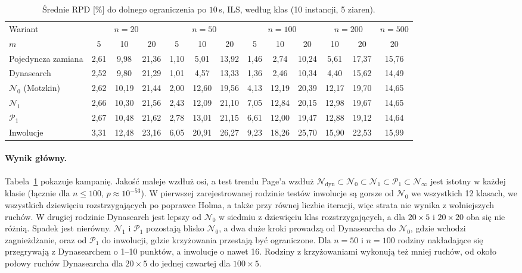 \documentclass[10pt,twocolumn]{article}
\newcommand{\N}{\mathcal{N}}
\newcommand{\Pa}{\mathcal{P}}
\begin{document}
\begin{table}[t]
\centering
\caption{Średnie RPD [\%] do dolnego ograniczenia po $10$\,s, ILS, według
klas (10 instancji, 5 ziaren).}
\label{tab:main}
\small
\begin{tabular}{@{}l*{12}{c}@{}}
\toprule
Wariant & \multicolumn{3}{c}{$n=20$} & \multicolumn{3}{c}{$n=50$} &
\multicolumn{3}{c}{$n=100$} & \multicolumn{2}{c}{$n=200$} & $n=500$ \\
$m$ & 5 & 10 & 20 & 5 & 10 & 20 & 5 & 10 & 20 & 10 & 20 & 20 \\
\midrule
Pojedyncza zamiana & 2,61 & 9,98 & 21,36 & 1,10 & 5,01 & 13,92 & 1,46 & 2,74 & 10,24 & 5,61 & 17,37 & 15,76 \\
Dynasearch & 2,52 & 9,80 & 21,29 & 1,01 & 4,57 & 13,33 & 1,36 & 2,46 & 10,34 & 4,40 & 15,62 & 14,49 \\
$\N_0$ (Motzkin) & 2,62 & 10,19 & 21,44 & 2,00 & 12,60 & 19,56 & 4,13 & 12,19 & 20,39 & 12,17 & 19,70 & 14,65 \\
$\N_1$ & 2,66 & 10,30 & 21,56 & 2,43 & 12,09 & 21,10 & 7,05 & 12,84 & 20,15 & 12,98 & 19,67 & 14,65 \\
$\Pa_1$ & 2,67 & 10,48 & 21,62 & 2,78 & 13,01 & 21,15 & 6,61 & 12,00 & 19,47 & 12,88 & 19,12 & 14,64 \\
Inwolucje & 3,31 & 12,48 & 23,16 & 6,05 & 20,91 & 26,27 & 9,23 & 18,26 & 25,70 & 15,90 & 22,53 & 15,99 \\
\bottomrule
\end{tabular}
\end{table}

\paragraph{Wynik główny.} Tabela~\ref{tab:main} pokazuje kampanię.
Jakość maleje wzdłuż osi, a test trendu Page'a wzdłuż
$\N_{\mathrm{dyn}}\subset\N_0\subset\N_1\subset\Pa_1\subset\N_\infty$
jest istotny w każdej klasie (łącznie dla $n\leq100$, $p\approx10^{-53}$).
W pierwszej zarejestrowanej rodzinie testów inwolucje są gorsze od
$\N_0$ we wszystkich 12 klasach, we wszystkich dziewięciu rozstrzygających
po poprawce Holma, a także przy równej liczbie iteracji, więc strata nie
wynika z wolniejszych ruchów. W drugiej rodzinie Dynasearch jest lepszy od
$\N_0$ w siedmiu z dziewięciu klas rozstrzygających, a dla $20\times5$
i $20\times20$ oba się nie różnią. Spadek jest nierówny. $\N_1$ i $\Pa_1$
pozostają blisko $\N_0$, a dwa duże kroki prowadzą od Dynasearcha do
$\N_0$, gdzie wchodzi zagnieżdżanie, oraz od $\Pa_1$ do inwolucji, gdzie
krzyżowania przestają być ograniczone. Dla $n=50$ i $n=100$ rodziny
nakładające się przegrywają z Dynasearchem o 1--10 punktów, a inwolucje
o nawet 16. Rodziny z krzyżowaniami wykonują też mniej ruchów, od około
połowy ruchów Dynasearcha dla $20\times5$ do jednej czwartej dla
$100\times5$.
\end{document}
